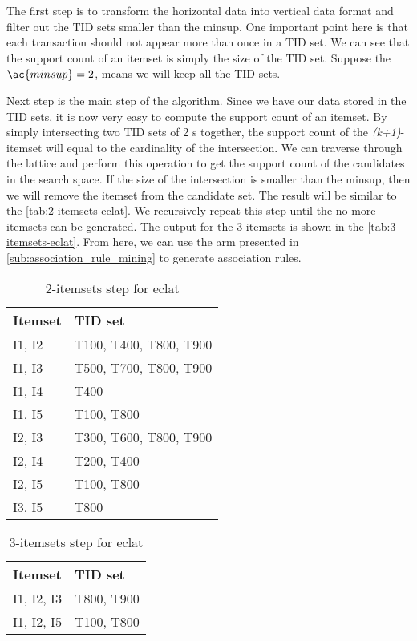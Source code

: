 The first step is to transform the horizontal data into vertical data format and filter out the \ac{TID} sets smaller than the \ac{minsup}.
One important point here is that each transaction should not appear more than once in a \ac{TID} set.
We can see that the support count of an itemset is simply the size of the \ac{TID} set.
Suppose the $\ac{minsup}=2$, means we will keep all the \ac{TID} sets.

Next step is the main step of the algorithm.
Since we have our data stored in the \ac{TID} sets, it is now very easy to compute the support count of an itemset.
By simply intersecting two \ac{TID} sets of 2 \kItemset s together, the support count of the \textit{(k+1)}-itemset will equal to the cardinality of the intersection.
We can traverse through the lattice and perform this operation to get the support count of the candidates in the search space.
If the size of the intersection is smaller than the \ac{minsup}, then we will remove the itemset from the candidate set.
The result will be similar to the \autoref{tab:2-itemsets-eclat}.
We recursively repeat this step until the no more itemsets can be generated.
The output for the 3-itemsets is shown in the \autoref{tab:3-itemsets-eclat}.
From here, we can use the \acl{arm} presented in \autoref{sub:association_rule_mining} to generate association rules.

\begin{table}[]
    \centering
    \begin{tabular}{|l|l|}
    \hline
    Itemset & TID set                \\ \hline
    I1, I2  & T100, T400, T800, T900 \\ \hline
    I1, I3  & T500, T700, T800, T900 \\ \hline
    I1, I4  & T400                   \\ \hline
    I1, I5  & T100, T800             \\ \hline
    I2, I3  & T300, T600, T800, T900 \\ \hline
    I2, I4  & T200, T400             \\ \hline
    I2, I5  & T100, T800             \\ \hline
    I3, I5  & T800                   \\ \hline
    \end{tabular}
    \caption{2-itemsets step for \ac{eclat} \citep{han2012mining}}
    \label{tab:2-itemsets-eclat}
\end{table}

\begin{table}[]
    \centering
    \begin{tabular}{|l|l|}
    \hline
    Itemset     & TID set    \\ \hline
    I1, I2, I3  & T800, T900 \\ \hline
    I1, I2, I5  & T100, T800 \\ \hline
    \end{tabular}
    \caption{3-itemsets step for \ac{eclat} \citep{han2012mining}}
    \label{tab:3-itemsets-eclat}
\end{table}

